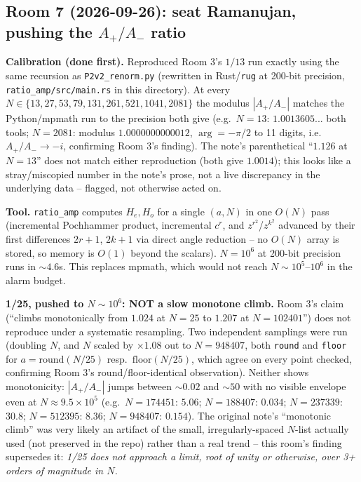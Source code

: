 \subsection*{Room 7 (2026-09-26): seat Ramanujan, pushing the $A_+/A_-$ ratio}

\textbf{Calibration (done first).} Reproduced Room 3's $1/13$ run exactly using the same
recursion as \texttt{P2v2\_renorm.py} (rewritten in Rust/\texttt{rug} at 200-bit precision,
\texttt{ratio\_amp/src/main.rs} in this directory). At every $N\in\{13,27,53,79,131,261,521,
1041,2081\}$ the modulus $|A_+/A_-|$ matches the Python/mpmath run to the precision both give
(e.g.\ $N=13$: $1.0013605...$ both tools; $N=2081$: modulus $1.0000000000012$, $\arg=-\pi/2$ to
11 digits, i.e.\ $A_+/A_-\to -i$, confirming Room 3's finding). The note's parenthetical
``$1.126$ at $N=13$'' does not match either reproduction (both give $1.0014$); this looks like a
stray/miscopied number in the note's prose, not a live discrepancy in the underlying data --
flagged, not otherwise acted on.

\textbf{Tool.} \texttt{ratio\_amp} computes $H_e,H_o$ for a single $(a,N)$ in one $O(N)$ pass
(incremental Pochhammer product, incremental $c^r$, and $z^{r^2}$/$z^{k^2}$ advanced by their
first differences $2r{+}1$, $2k{+}1$ via direct angle reduction -- no $O(N)$ array is stored, so
memory is $O(1)$ beyond the scalars). $N=10^6$ at 200-bit precision runs in $\sim\!4.6$s. This
replaces mpmath, which would not reach $N\sim10^5$--$10^6$ in the alarm budget.

\textbf{1/25, pushed to $N\sim10^6$: NOT a slow monotone climb.} Room 3's claim (``climbs
monotonically from $1.024$ at $N=25$ to $1.207$ at $N=102401$'') does not reproduce under a
systematic resampling. Two independent samplings were run (doubling $N$, and $N$ scaled by
$\times1.08$ out to $N=948407$, both \texttt{round} and \texttt{floor} for $a=\mathrm{round}(N/25)$
resp.\ $\mathrm{floor}(N/25)$, which agree on every point checked, confirming Room 3's
round/floor-identical observation). Neither shows monotonicity: $|A_+/A_-|$ jumps between
$\sim0.02$ and $\sim50$ with no visible envelope even at $N\approx9.5\times10^5$ (e.g.\
$N=174451$: $5.06$; $N=188407$: $0.034$; $N=237339$: $30.8$; $N=512395$: $8.36$; $N=948407$:
$0.154$). The original note's ``monotonic climb'' was very likely an artifact of the small,
irregularly-spaced $N$-list actually used (not preserved in the repo) rather than a real trend --
this room's finding supersedes it: \emph{1/25 does not approach a limit, root of unity or
otherwise, over 3+ orders of magnitude in $N$.}

